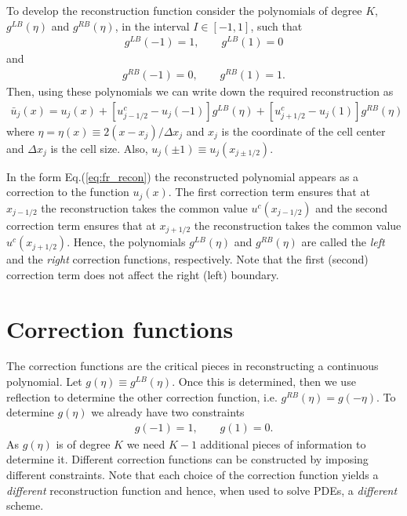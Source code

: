 \documentclass[11pt, reqno]{amsart}
\newcommand{\eqr}[1]{Eq.\thinspace(#1)}
\theoremstyle{definition}
\begin{document}
To develop the reconstruction function consider the polynomials of
degree $K$, $g^{LB}(\eta)$ and $g^{RB}(\eta)$, in the interval $I\in
[-1,1]$, such that
\begin{align}
  g^{LB}(-1) = 1, \qquad
  g^{LB}(1) = 0 \label{eq:glb}
\end{align}
and 
\begin{align}
  g^{RB}(-1) = 0, \qquad
  g^{RB}(1) = 1. \label{eq:grb}
\end{align}
Then, using these polynomials we can write down the required
reconstruction as
\begin{align}\label{eq:fr_recon}
  \boxed{
  \bar{u}_j(x)
  =
  u_j(x)
  +
  [u^c_{j-1/2} - u_j(-1)]g^{LB}(\eta)
  +
  [u^c_{j+1/2} - u_j(1)]g^{RB}(\eta)
}
\end{align}
where $\eta = \eta(x) \equiv 2(x-x_j)/\Delta x_j$ and $x_j$ is the
coordinate of the cell center and $\Delta x_j$ is the cell size. Also,
$u_j(\pm 1) \equiv u_j(x_{j\pm 1/2})$.

In the form \eqr{\ref{eq:fr_recon}} the reconstructed polynomial
appears as a correction to the function $u_j(x)$. The first correction
term ensures that at $x_{j-1/2}$ the reconstruction takes the common
value $u^c(x_{j-1/2})$ and the second correction term ensures that at
$x_{j+1/2}$ the reconstruction takes the common value
$u^c(x_{j+1/2})$. Hence, the polynomials $g^{LB}(\eta)$ and
$g^{RB}(\eta)$ are called the \emph{left} and the \emph{right}
correction functions, respectively. Note that the first
(second) correction term does not affect the right (left) boundary.

\section{Correction functions}

The correction functions are the critical pieces in reconstructing a
continuous polynomial. Let $g(\eta)\equiv g^{LB}(\eta)$. Once this is
determined, then we use reflection to determine the other correction
function, i.e. $g^{RB}(\eta) = g(-\eta)$. To determine $g(\eta)$ we
already have two constraints
\begin{align}\label{eq:gcond}
  g(-1) = 1, \qquad g(1) = 0.
\end{align}
As $g(\eta)$ is of degree $K$ we need $K-1$ additional pieces of
information to determine it. Different correction functions can be
constructed by imposing different constraints. Note that each choice
of the correction function yields a \emph{different} reconstruction
function and hence, when used to solve PDEs, a \emph{different}
scheme.
\end{document}
